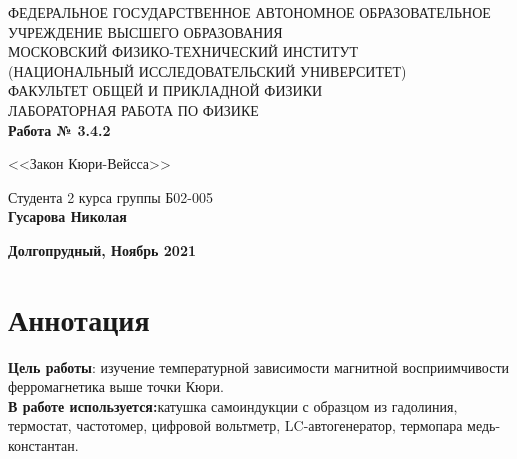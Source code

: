 \documentclass[a4paper]{article}
\begin{document}
\begin{center}
	\hfill \break
	\hfill \break
	{\small ФЕДЕРАЛЬНОЕ ГОСУДАРСТВЕННОЕ АВТОНОМНОЕ ОБРАЗОВАТЕЛЬНОЕ\\ УЧРЕЖДЕНИЕ ВЫСШЕГО ОБРАЗОВАНИЯ\\ МОСКОВСКИЙ ФИЗИКО-ТЕХНИЧЕСКИЙ ИНСТИТУТ\\ (НАЦИОНАЛЬНЫЙ ИССЛЕДОВАТЕЛЬСКИЙ УНИВЕРСИТЕТ)\\ ФАКУЛЬТЕТ ОБЩЕЙ И ПРИКЛАДНОЙ ФИЗИКИ}\\
	\hfill \break
	\hfill \break
	\hfill \break
	\hfill \break
	\hfill \break
	\normalsize{ЛАБОРАТОРНАЯ РАБОТА ПО ФИЗИКЕ}\\
	\hfill \break
	\hfill \break
	\hfill \break
	\hfill \break
	\normalsize{\textbf{Работа № 3.4.2}}\\
	\hfill \break

	\hfill \break
	\large{<<Закон Кюри-Вейсса>>}\\
\end{center}
\hfill \break
\hfill \break
\hfill \break
\hfill \break



\begin{flushright}
	\normalsize{Студента 2 курса группы Б02-005}\\
	\normalsize{\textbf{Гусарова Николая}}\\
\end{flushright}
\hfill \break
\hfill \break
	\hfill \break
	\hfill \break
	\hfill \break
	\hfill \break
\hfill \break
\hfill \break
\hfill \break
\hfill \break

\begin{center}
	\normalsize{\textbf{Долгопрудный, Ноябрь 2021}}
\end{center}


\thispagestyle{empty} %


	
	\newpage
	\section{Аннотация}
    \textbf{Цель работы}: изучение температурной зависимости магнитной восприимчивости ферромагнетика выше точки Кюри.\\
    
	
	\textbf{В работе используется:}катушка самоиндукции с образцом из гадолиния, термостат, частотомер, цифровой вольтметр, LC-автогенератор, термопара медь-константан.\\
	
\end{document}
